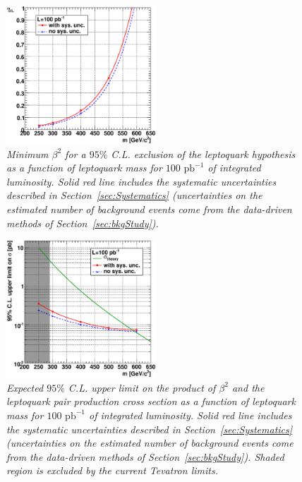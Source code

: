 \begin{figure}[h!]
 \centering
  \includegraphics[width=0.5\textwidth]{plots/cmsPotential/beta2_vs_m_excl.eps}
 \caption{\small \sl Minimum $\beta^2$ for
a $95\%$ C.L. exclusion of the leptoquark hypothesis as a function of leptoquark mass for $100\text{ pb}^{-1}$ of integrated luminosity. 
Solid red line includes the systematic uncertainties described in Section~\ref{sec:Systematics}
(uncertainties on the estimated number of background events come from the data-driven methods of Section~\ref{sec:bkgStudy}).
\label{fig:exclusion_beta}}
\end{figure}


\begin{figure}[h!]
 \centering
  \includegraphics[width=0.5\textwidth]{plots/cmsPotential/xs95CL_vs_m_log.eps}
 \caption{\small \sl Expected $95\%$ C.L. upper limit on the product of $\beta^2$ and the leptoquark pair production cross section 
as a function of leptoquark mass for $100\text{ pb}^{-1}$ of integrated luminosity. 
Solid red line includes the systematic uncertainties described in Section~\ref{sec:Systematics}
(uncertainties on the estimated number of background events come from the data-driven methods of Section~\ref{sec:bkgStudy}).
Shaded region is excluded by the current Tevatron limits.
\label{fig:exclusion_xs}}
\end{figure}


